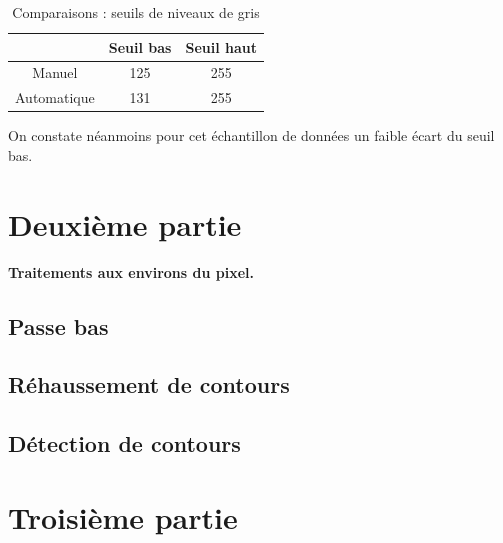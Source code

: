 \documentclass{scrreprt}
\begin{document}
\begin{table}[H]
        \begin{center}
                \begin{tabular}{|c|c|c|}
                   \hline
                   & Seuil bas & Seuil haut \\
                   \hline
                   Manuel & 125 & 255\\
                   \hline
                   Automatique & 131 & 255\\
                   \hline
                \end{tabular}
        \end{center}
        \caption{Comparaisons : seuils de niveaux de gris}
\end{table} 

On constate néanmoins pour cet échantillon de données un faible écart du seuil bas.

\chapter{Deuxième partie}

\begin{center}
\large{
\textbf{Traitements aux environs du pixel.}}
\end{center}

\section{Passe bas}

\section{Réhaussement de contours}



\newpage
\section{Détection de contours}

\newpage
\chapter{Troisième partie}
\end{document}
